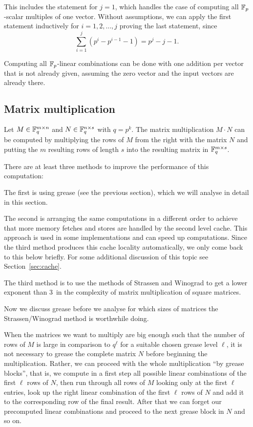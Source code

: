 This includes the statement for $j=1$, which handles the case of computing
all $\mathbb{F}_p$-scalar multiples of one vector. Without assumptions, we can
apply the first statement inductively for $i=1, 2, \ldots, j$ proving
the last statement, since
\[ \sum_{i=1}^j (p^i - p^{i-1} - 1) = p^j - j - 1. \]
\ProofEnd

\begin{Rem}
Computing all $\mathbb{F}_p$-linear combinations can be done
with one addition per vector that is not already given, assuming
the zero vector and the input vectors are already there.
\end{Rem}

\subsection{Matrix multiplication}

Let $M \in \mathbb{F}_q^{m \times n}$ and $N \in \mathbb{F}_q^{n \times s}$ with $q = p^k$.
The matrix multiplication $M \cdot N$ can be computed by multiplying the
rows of $M$ from the right with the matrix $N$ and putting the $m$ resulting
rows of length $s$ into the resulting matrix in $\mathbb{F}_q^{m \times s}$.

There are at least three methods to improve the performance of this
computation: 

The first is using grease (see the previous section), which
we will analyse in detail in this section. 

The second is arranging the same computations in a different order to 
achieve that more memory fetches and stores are handled by the second
level cache. This approach is used in some implementations and can
speed up computations. Since the third method produces this cache locality
automatically, we only come back to this below briefly.
For some additional discussion of this topic see Section~\ref{sec:cache}. 

The third method is to use the methods of Strassen and Winograd to
%
get a lower exponent than $3$~in the complexity of matrix multiplication
of square matrices.

Now we discuss grease before we analyse for which sizes of
matrices the Strassen/Winograd method is worthwhile doing.

When the matrices we want to multiply are big enough such that the number
of rows of $M$ is large in comparison to $q^\ell$
for a suitable chosen grease level $\ell$, it is not necessary to grease
the complete matrix $N$ before beginning the multiplication. Rather,
we can proceed with the whole multiplication ``by grease blocks'', that
is, we compute in a first step all possible linear combinations of the
first $\ell$ rows of $N$, then run through all rows of $M$ looking
only at the first $\ell$ entries, look up the right
linear combination of the first $\ell$ rows of $N$ and add it 
to the corresponding
row of the final result. After that we can forget our precomputed linear
combinations and proceed to the next grease block in $N$ and so on.

